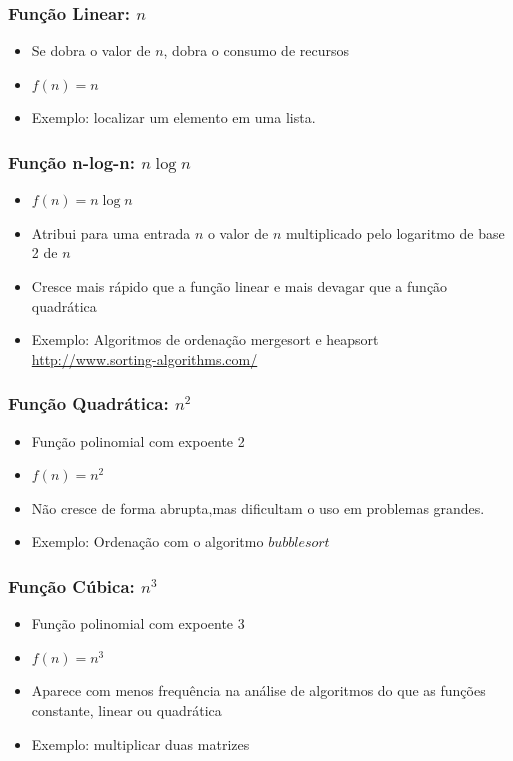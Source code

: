 \documentclass[aspectratio=169]{beamer}
\begin{document}
\begin{frame}\frametitle{Função Linear: $n$}
\begin{itemize}
	\item Se dobra o valor de $n$, dobra o consumo de recursos
	\item $f(n) = n$
	\item Exemplo: localizar um elemento em uma lista.
\end{itemize}
\end{frame}

\begin{frame}\frametitle{Função n-log-n: $n \log n$}	
\begin{itemize}
	\item $f(n) = n \log n$
	\item Atribui para uma entrada $n$ o valor de $n$ multiplicado pelo logaritmo de base 2 de $n$
	\item Cresce mais rápido que a função linear e mais devagar que a função quadrática
	\item Exemplo: Algoritmos de ordenação mergesort e heapsort\\\url{http://www.sorting-algorithms.com/}
\end{itemize}
\end{frame}

\begin{frame}\frametitle{Função Quadrática: $n^2$}
\begin{itemize}
	\item Função polinomial com expoente 2
	\item $f(n) = n^2$
	\item Não cresce de forma abrupta,mas dificultam o uso em problemas grandes.
	\item Exemplo: Ordenação com o algoritmo $bubblesort$
\end{itemize}
\end{frame}

\begin{frame}\frametitle{Função Cúbica: $n^3$}
\begin{itemize}
	\item Função polinomial com expoente 3
	\item $f(n) = n^3$
	\item Aparece com menos frequência na análise de algoritmos do que as funções constante, linear ou quadrática
	\item Exemplo: multiplicar duas matrizes
\end{itemize}
\end{frame}
\end{document}
